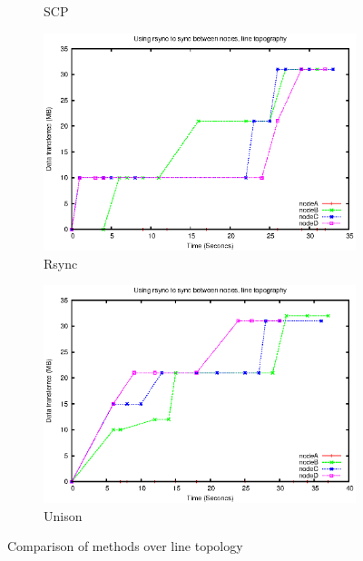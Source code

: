 \documentclass[12pt]{article}
\begin{document}
\begin{figure}[htp]
\begin{subfigure}[b]{0.5\linewidth}
        \caption{SCP}
        \label{fig:line_scp}
    \end{subfigure}

    \begin{subfigure}[b]{0.5\linewidth}
        \centering
        \includegraphics[scale=0.5]{images/line-rsync-10-fixes.eps}
        \caption{Rsync}
        \label{fig:line_rsync}
    \end{subfigure}
    \begin{subfigure}[b]{0.5\linewidth}
        \centering
        \includegraphics[scale=0.5]{images/line-uni-10-fixes.eps}
        \caption{Unison}
        \label{fig:line_uni}
    \end{subfigure}
    \caption{Comparison of methods over line topology}
\end{figure}
\newpage
\end{document}
